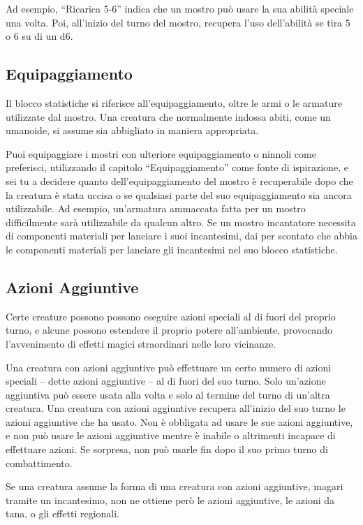 Ad esempio, ``Ricarica 5-6'' indica che un mostro può usare la sua abilità speciale una volta. Poi, all'inizio del turno del mostro, recupera l'uso dell'abilità se tira 5 o 6 su di un d6.

\subsection{Equipaggiamento}

Il blocco statistiche si riferisce all'equipaggiamento, oltre le armi o
le armature utilizzate dal mostro. Una creatura che normalmente indossa
abiti, come un umanoide, si assume sia abbigliato in maniera
appropriata.

Puoi equipaggiare i mostri con ulteriore equipaggiamento o ninnoli come
preferisci, utilizzando il capitolo ``Equipaggiamento'' come fonte di
ispirazione, e sei tu a decidere quanto dell'equipaggiamento del mostro
è recuperabile dopo che la creatura è stata uccisa o se qualsiasi parte
del suo equipaggiamento sia ancora utilizzabile. Ad esempio, un'armatura
ammaccata fatta per un mostro difficilmente sarà utilizzabile da qualcun altro.  Se un mostro incantatore necessita di componenti  materiali per lanciare i suoi incantesimi, dai per  scontato che abbia le componenti materiali per lanciare  gli incantesimi nel suo blocco statistiche.

\subsection{Azioni Aggiuntive}

Certe creature possono  possono eseguire azioni speciali al di fuori del proprio  turno, e alcune possono estendere il proprio potere  all'ambiente, provocando l'avvenimento di effetti magici  straordinari nelle loro vicinanze.

Una creatura con azioni aggiuntive può effettuare un certo  numero di azioni speciali -- dette azioni aggiuntive -- al  di fuori del suo turno. Solo un'azione aggiuntiva può  essere usata alla volta e solo al termine del turno di  un'altra creatura. Una creatura con azioni aggiuntive recupera  all'inizio del suo turno le azioni aggiuntive che ha  usato. Non è obbligata ad usare le sue azioni aggiuntive, e non può usare le azioni aggiuntive mentre è inabile o altrimenti incapace di effettuare  azioni. Se sorpresa, non può usarle fin dopo il suo  primo turno di combattimento.

Se una creatura assume la forma di una creatura con azioni aggiuntive, magari tramite un incantesimo, non ne  ottiene però le azioni aggiuntive, le azioni da tana, o  gli effetti regionali.

